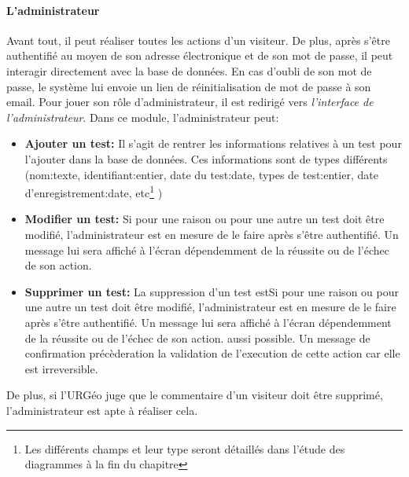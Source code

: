                 \paragraph{L'administrateur}
                Avant tout, il peut réaliser toutes les actions d'un visiteur. De plus, après s'être authentifié au moyen de 
                son adresse électronique et de son mot de passe, il peut interagir directement avec la base de données. En cas 
                d'oubli de son mot de passe, le système lui envoie un lien de réinitialisation de mot de passe à son email.
                Pour jouer son rôle d'administrateur, il est redirigé vers \textit{l'interface de l'administrateur}. 
                Dans ce module, l'administrateur peut:
                \begin{itemize}
                        \item \textbf{Ajouter un test: }
                        Il s'agit de rentrer les informations relatives à un test pour l'ajouter dans la base de données.
                        Ces informations sont de types différents (nom:texte, identifiant:entier, date du test:date, types
                        de test:entier, date d'enregistrement:date, etc\footnote{Les différents champs et leur type seront 
                        détaillés dans l'étude des diagrammes à la fin du chapitre} )
                        \item \textbf{Modifier un test: }
                        Si pour une raison ou pour une autre un test doit être modifié, l'administrateur est en
                        mesure de le faire après s'être authentifié. Un message lui sera affiché à l'écran dépendemment 
                        de la réussite ou de l'échec de son action.
                        \item \textbf{Supprimer un test: }
                        La suppression d'un test estSi pour une raison ou pour une autre un test doit être modifié, l'administrateur est en
                        mesure de le faire après s'être authentifié. Un message lui sera affiché à l'écran dépendemment 
                        de la réussite ou de l'échec de son action. aussi possible. Un message de confirmation précèderation la validation
                        de l'execution de cette action car elle est irreversible.
                \end{itemize}
                \par
                De plus, si l'URGéo juge que le commentaire d'un visiteur doit être supprimé,
                l'administrateur est apte à réaliser cela.
